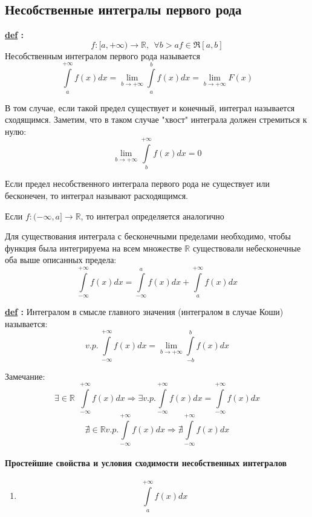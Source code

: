 \documentclass[a4paper,11pt]{article}
\newcommand{\Def}[1]{ 
\noindent\makebox[\linewidth]{\rule{\textwidth}{1pt}} 

 \noindent \textbf{\underline{def} :}
#1 

\noindent\makebox[\linewidth]{\rule{\textwidth}{1pt}} }
\newcommand{\R}{\mathbb{R}}
\begin{document}
\subsection{Несобственные интегралы первого рода}

\Def
{\label{def:notmyint}
\[
f: [a, +\infty) \to \R, \ \  \forall b > a f\in \Re[a, b] 
\]	
Несобственным интегралом первого рода называется
\[
\int\limits_a^{+\infty} f(x)dx = \lim\limits_{b \to +\infty} \int\limits_a^b f(x)dx = \lim\limits_{b \to +\infty} F(x)
\]

В том случае, если такой предел существует и конечный, интеграл называется сходящимся. Заметим, что в таком случае "хвост" интеграла должен стремиться к  нулю:
\[
\lim\limits_{b \to +\infty} \int\limits_b^{+\infty} f(x)dx = 0
\]

Если предел несобственного интеграла первого рода не существует или бесконечен, то интеграл называют расходящимся.

Если $f: (- \infty, a] \to \R$, то интеграл определяется аналогично

Для существования интеграла с бесконечными пределами необходимо, чтобы функция была интегрируема на всем множестве $\R$ существовали небесконечные  оба выше описанных предела:
\[
\int\limits_{-\infty}^{+\infty} f(x)dx = \int\limits_{-\infty}^{a} f(x)dx +  \int\limits_a^{+\infty} f(x)dx 
\]
}

\Def
{ \label{def:intmain}
Интегралом в смысле главного значения (интегралом в случае Коши) называется:
\[
v.p. \ \int\limits_{-\infty}^{+\infty} f(x)dx = \lim\limits_{b \to +\infty} \int\limits_{-b}^b f(x)dx
\]

Замечание:
\[
\exists \in \R  \ \ \int\limits_{-\infty}^{+\infty} f(x)dx  \Rightarrow \exists v.p. \int\limits_{-\infty}^{+\infty} f(x)dx  = \int\limits_{-\infty}^{+\infty} f(x)dx
\]
\[
\nexists \in \R v.p. \int\limits_{-\infty}^{+\infty} f(x)dx \Rightarrow \nexists \int\limits_{-\infty}^{+\infty} f(x)dx
\]
}

\paragraph{Простейшие свойства и условия сходимости несобственных интегралов}

\begin{enumerate}
	\item 
	\[
	\int\limits_a^{+\infty}f(x)dx
	\]
\end{enumerate}
\end{document}
